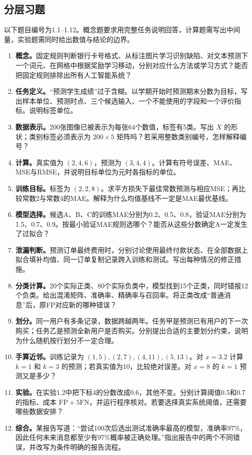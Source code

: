 \documentclass[UTF8,fontset=none,zihao=-4,a4paper]{ctexart}
\numberwithin{equation}{section}
\numberwithin{figure}{section}
\begin{document}
\clearpage
\subsection{分层习题}
以下题目编号为1.1--1.12。概念题要求用完整任务说明回答，计算题需写出中间量，实验题需同时给出数值与结论的边界。
\begin{enumerate}[label=\textbf{1.\arabic*}]
\item \textbf{概念。}固定规则判断银行卡号格式、从标注图片学习识别缺陷、对文本预测下一个词元、在网格中根据奖励学习移动，分别对应什么方法或学习方式？能否把固定规则排除出所有人工智能系统？
\item \textbf{任务定义。}“预测学生成绩”过于含糊。以学期开始时预测期末分数为目标，写出样本单位、预测时点、三个候选输入、一个不能使用的字段和一个评价指标。说明标签单位。
\item \textbf{数据表示。}200张图像已被表示为每张64个数值，标签有5类。写出 $X$ 的形状；类别标签必须表示为 $200\times5$ 矩阵吗？若采用整数类别编号，怎样解释编号？
\item \textbf{计算。}真实值为 $(2,4,6)$，预测为 $(3,4,4)$。计算有符号误差、MAE、MSE与RMSE，并说明目标单位为元时各指标的单位。
\item \textbf{训练目标。}标签为 $(2,2,8)$。求平方损失下最佳常数预测与相应MSE；再比较常数2与常数4的MAE。解释为什么均值基线不一定是MAE最优基线。
\item \textbf{模型选择。}候选A、B、C的训练MAE分别为0.2、0.5、0.8，验证MAE分别为1.5、0.7、0.9。按最小验证MAE规则选哪个？能否从这些分数确定A一定发生了过拟合？
\item \textbf{泄漏判断。}预测订单最终费用时，分别讨论使用最终付款状态、在全部数据上拟合填补均值、同一订单复制记录跨入训练和测试。写出每种情况的修正措施。
\item \textbf{分类计算。}20个实际正类、80个实际负类中，模型找到15个正类，同时错报12个负类。给出混淆矩阵、准确率、精确率与召回率。将正类改成“普通消息”后，原FP对应新的哪种错误？
\item \textbf{划分。}同一用户有多条记录，数据跨越两年。任务甲是预测已有用户的下一次购买；任务乙是预测全新用户是否购买。分别提出合适的主要划分约束，说明为什么随机按行划分不一定合理。
\item \textbf{手算近邻。}训练记录为 $(1,5),(2,7),(4,11),(5,13)$。对 $x=3.2$ 计算 $k=1$ 和 $k=3$ 的预测；若真实值为10，比较绝对误差。对 $x=8$ 的 $k=1$ 预测又是多少？
\item \textbf{实验。}在实验1.2中把下标4的分数改成0.6，其他不变。分别计算阈值0.5和0.7的指标、成本 $\mathrm{FP}+5\mathrm{FN}$，并运行程序核对。若要选择真实系统阈值，还需要哪些数据安排？
\item \textbf{综合。}某报告写道：“尝试100次后选出测试准确率最高的模型，准确率97\%，因此任何未来消息都至少有97\%概率被正确处理。”指出报告中的两个不同错误，并改写为条件明确的报告流程。
\end{enumerate}
\end{document}
